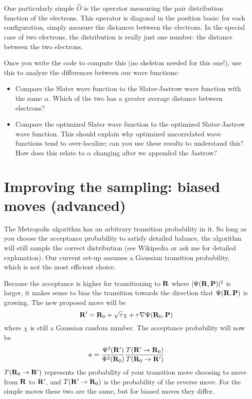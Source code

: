 \documentclass[12pt]{article}
\newcommand{\bR}{{\bf R}}
\newcommand{\bP}{{\bf P}}
\begin{document}
One particularly simple $\hat O$ is the operator measuring the pair distribution function of the electrons. 
This operator is diagonal in the position basis: for each configuration, simply measure the distances between the electrons.
In the special case of two electrons, the distribution is really just one number: the distance between the two electrons.

Once you write the code to compute this (no skeleton needed for this one!), use this to analyze the differences between our wave functions:
\begin{itemize}
  \item
    Compare the Slater wave function to the Slater-Jastrow wave function with the same $\alpha$. 
    Which of the two has a greater average distance between electrons?
  \item
    Compare the optimized Slater wave function to the optimized Slater-Jastrow wave function. 
    This should explain why optimized uncorrelated wave functions tend to over-localize; can you use these results to understand this? How does this relate to $\alpha$ changing after we appended the Jastrow?
\end{itemize}

\section{Improving the sampling: biased moves (advanced)} 

The Metropolis algorithm has an arbitrary transition probability in it. 
So long as you choose the acceptance probability to satisfy detailed balance, the algorithm will still sample the correct distribution (see Wikipedia or ask me for detailed explanation).
Our current set-up assumes a Gaussian transition probability, which is not the most efficient choice.

Because the acceptance is higher for transitioning to $\bR$ where $|\Psi(\bR,\bP)|^2$ is larger, it makes sense to bias the transition towards the direction that $\Psi(\bR,\bP)$ is growing.
The new proposed move will be
\begin{equation}
  \bR'=\bR_0 + \sqrt{\tau} \chi + \tau \nabla \Psi(\bR_0,\bP)
\end{equation}
where $\chi$ is still a Gaussian random number.
The acceptance probability will now be 
\begin{equation}
  a=\frac{\Psi^2(\bR')}{\Psi^2(\bR_0)}
  \frac{T(\bR' \to \bR_0)}{T(\bR_0 \to \bR')}
\end{equation}
$T(\bR_0 \to \bR')$ represents the probability of your transition move choosing to move from $\bR$ to $\bR'$, and $T(\bR' \to \bR_0)$ is the probability of the reverse move.
For the simple moves these two are the same, but for biased moves they differ.
\end{document}
